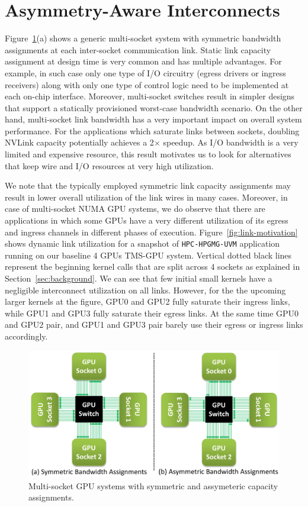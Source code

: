 \section{Asymmetry-Aware Interconnects}
\label{sec:interconnect}

Figure~\ref{fig:symmetric_assymetric}(a) shows a generic multi-socket system
with symmetric bandwidth assignments at each inter-socket communication link.
Static link capacity assignment at design time is very common and has multiple
advantages. For example, in such case only one type of I/O circuitry (egress
drivers or ingress receivers) along with only one type of control logic need to
be implemented at each on-chip interface. Moreover, multi-socket switches
result in simpler designs that support a statically provisioned worst-case
bandwidth scenario. On the other hand, multi-socket link bandwidth has a very
important impact on overall system performance. For the applications which 
saturate links between sockets, doubling NVLink capacity potentially achieves a 
2$\times$ speedup. As I/O bandwidth is a very limited and expensive resource, this
result motivates us to look for alternatives that keep wire and I/O resources
at very high utilization. 

We note that the typically employed symmetric link
capacity assignments may result in lower overall utilization of the link wires
in many cases. Moreover, in case of multi-socket NUMA GPU systems, we do observe that there
are applications in which some GPUs have a very different utilization of its
egress and ingress channels in different phases of execution.
Figure~\ref{fig:link-motivation} shows dynamic link utilization for a snapshot
of \texttt{HPC-HPGMG-UVM} application running on our baseline 4 GPUs TMS-GPU
system. Vertical dotted black lines represent the beginning kernel calls that
are split across 4 sockets as explained in Section~\ref{sec:background}. We can 
see
that few initial small kernels have a negligible interconnect
utilization on all links. However, for the the upcoming larger kernels at the
figure, GPU0 and GPU2 fully saturate their ingress links, while GPU1 and GPU3
fully saturate their egress links. At the same time GPU0 and GPU2 pair,
and GPU1 and GPU3 pair barely use their egress or ingress links accordingly.

\begin{figure}[t]
    \centering
    \includegraphics[width=1.0\columnwidth]{figures/tms_links.pdf}
    \caption{Multi-socket GPU systems with symmetric and assymeteric capacity 
assignments.}
    \label{fig:symmetric_assymetric}
\end{figure}

